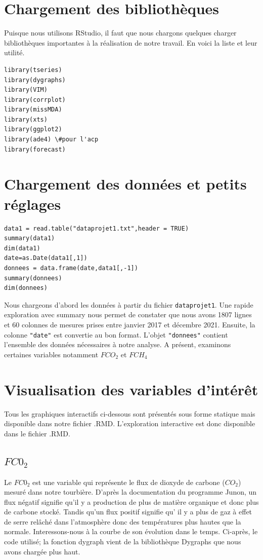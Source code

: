 \documentclass[a4paper,12pt]{report}%
\begin{document}
\section{Chargement des bibliothèques}

Puisque nous utilisons RStudio, il faut que nous chargons quelques charger bibliothèques importantes à la réalisation de notre travail. En voici la liste et leur utilité.
\begin{lstlisting}
library(tseries) 
library(dygraphs)
library(VIM) 
library(corrplot)
library(missMDA)
library(xts)
library(ggplot2)
library(ade4) \#pour l'acp
library(forecast)
\end{lstlisting}


\section{Chargement des données et petits réglages}

\begin{lstlisting}
data1 = read.table("dataprojet1.txt",header = TRUE) 
summary(data1) 
dim(data1)
date=as.Date(data1[,1])
donnees = data.frame(date,data1[,-1])
summary(donnees) 
dim(donnees)
\end{lstlisting}

Nous chargeons d'abord les données à partir du fichier \texttt{dataprojet1}. Une rapide exploration avec summary nous permet de constater que nous avons 1807 lignes et 60 colonnes de mesures prises entre janvier 2017 et décembre 2021. \newline 
Ensuite, la colonne \texttt{"date"}  est convertie au bon format. L'objet \texttt{"donnees"} contient l'ensemble des données nécessaires à notre analyse.\newline
A présent, examinons certaines variables notamment $FCO_2$ et $FCH_4$ 

\section{Visualisation des variables d'intérêt}
Tous les graphiques interactifs ci-dessous sont présentés sous forme statique mais disponible dans notre fichier .RMD. L'exploration interactive est donc disponible dans le fichier .RMD.
 \subsection{$FC0_2$}

Le $FC0_2$ est une variable qui  représente le flux de dioxyde de carbone ($CO_2$) mesuré dans notre tourbière. D'après la documentation du programme Junon, un flux négatif signifie qu'il y a production de plus de matière organique et donc plus de carbone stocké. Tandis qu'un flux positif signifie qu' il y a  plus de gaz à effet de serre relâché dans l'atmosphère donc des températures plus hautes que la normale. \newline
Interessons-nous à la courbe de son évolution dans le temps. Ci-après, le code utilisé; la fonction dygraph vient de la bibliothèque Dygraphs que nous avons chargée plus haut.
\end{document}
